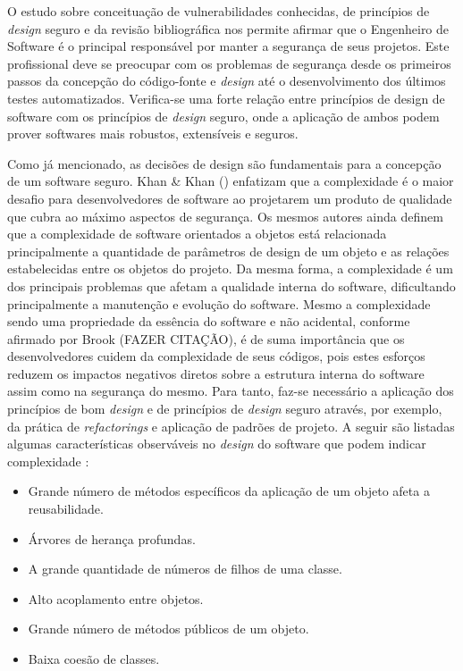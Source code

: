 %

O estudo sobre conceituação de vulnerabilidades conhecidas, de princípios de \emph{design} seguro e da revisão bibliográfica nos permite afirmar que o Engenheiro de Software é o principal responsável por manter a segurança de seus projetos. Este profissional deve se preocupar com os problemas de segurança desde os primeiros passos da concepção do código-fonte e \emph{design} até o desenvolvimento dos últimos testes automatizados. Verifica-se uma forte relação entre princípios de design de software com os princípios de \emph{design} seguro, onde a aplicação de ambos podem prover softwares mais robustos, extensíveis e seguros. 

%

Como já mencionado, as decisões de design são fundamentais para a concepção de um software seguro. Khan \& Khan (\citeyear{khan2010}) enfatizam que a complexidade é o maior desafio para desenvolvedores de software ao projetarem um produto de qualidade que cubra ao máximo aspectos de segurança. Os mesmos autores ainda definem que a complexidade de software orientados a objetos está relacionada principalmente a quantidade de parâmetros de design de um objeto e as relações estabelecidas entre os objetos do projeto. Da mesma forma, a complexidade é um dos principais problemas que afetam a qualidade interna do software, dificultando principalmente a manutenção e evolução do software. Mesmo a complexidade sendo uma propriedade da essência do software e não acidental, conforme afirmado por Brook (FAZER CITAÇÃO), é de suma importância que os desenvolvedores cuidem da complexidade de seus códigos, pois estes esforços reduzem os impactos negativos diretos sobre a estrutura interna do software assim como na segurança do mesmo. Para tanto, faz-se necessário a aplicação dos princípios de bom \emph{design} e de princípios de \emph{design} seguro através, por exemplo, da prática de \emph{refactorings} e aplicação de padrões de projeto. A seguir são listadas algumas características observáveis no \emph{design} do software que podem indicar complexidade \cite{khan2010}:

%

\begin{itemize}
\item Grande número de métodos específicos da aplicação de um objeto afeta a reusabilidade.
\item Árvores de herança profundas.
\item A grande quantidade de números de filhos de uma classe.
\item Alto acoplamento entre objetos.
\item Grande número de métodos públicos de um objeto.
\item Baixa coesão de classes. 
\end{itemize}

